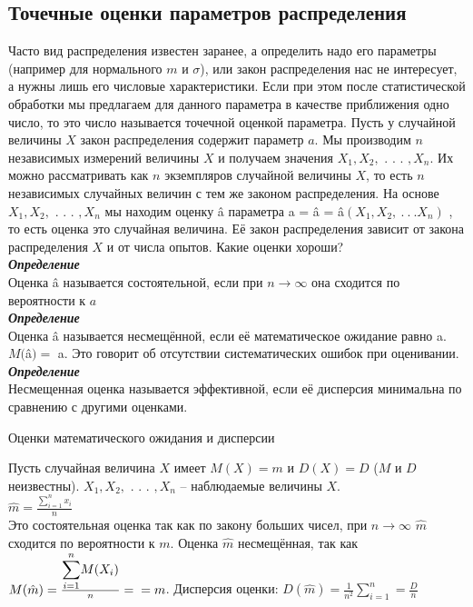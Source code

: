 \documentclass[russian, 12pt, fleqn]{article}
\begin{document}
\subsection{Точечные оценки параметров распределения}
Часто вид распределения известен заранее, а определить надо его параметры (например для нормального $m$ и $\sigma$), или закон распределения нас не интересует, а нужны лишь его числовые характеристики.  Если при этом после статистической обработки мы предлагаем для данного параметра в качестве приближения одно число, то это число называется точечной оценкой параметра. Пусть у случайной величины $X$ закон распределения содержит параметр $a$. Мы производим $n$ независимых измерений величины $X$ и получаем значения $X_1, X_2, $ . . . $,X_n$. Их можно рассматривать как $n$ экземпляров случайной величины $X$, то есть $n$ независимых случайных величин с тем же законом распределения. На основе $X_1, X_2, $ . . . $,X_n$ мы находим оценку â параметра a = â  = â$(X_1, X_2, \ .\ .\ . X_n)$ , то есть оценка это случайная величина. Её закон распределения зависит от закона распределения $X$ и от числа опытов. Какие оценки хороши?\\
\textit{\textbf{Определение}} \\
Оценка â называется состоятельной, если при $n \rightarrow \infty$ она сходится по вероятности к $a$\\
\textit{\textbf{Определение}} \\
Оценка â называется несмещённой, если её математическое ожидание равно a. $M($â$) = $ a. Это говорит об отсутствии систематических ошибок при оценивании.\\
\textit{\textbf{Определение}} \\
Несмещенная оценка называется эффективной, если её дисперсия минимальна по сравнению с другими оценками.
\begin{center}
$\textbf{Оценки математического ожидания и дисперсии}$
\end{center}
Пусть случайная величина $X$ имеет $M(X) = m$ и $D(X) = D$ ($M$ и $D$ неизвестны). $X_1, X_2, $ . . . $,X_n$ -- наблюдаемые величины $X$.\\
 \Large $\hat{m} =  \frac{\displaystyle{\sum \limits_{i = 1}^{ n }}x_i}{n} $ \normalsize\\
Это состоятельная оценка так как по закону больших чисел, при $n \rightarrow \infty$  $\hat{m}$ сходится по вероятности к $m$. Оценка $\hat{m}$ несмещённая, так как $M(\hat{m})=\frac{  \displaystyle{\sum \limits_{i = 1}^{n}} M(X_i)  }{n} =\\= m$. Дисперсия оценки: $D(\hat{m}) = \frac{1}{n^2} \displaystyle{\sum \limits_{i = 1}^{n}}  = \frac{D}{n}$\\
\end{document}
